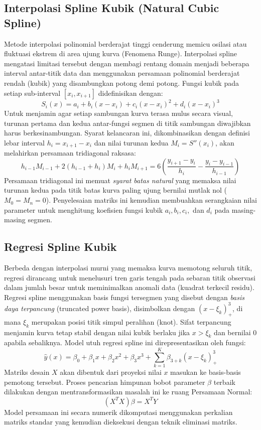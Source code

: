 \documentclass[12pt, a4paper]{article}
\begin{document}
\subsection{Interpolasi Spline Kubik (Natural Cubic Spline)}
Metode interpolasi polinomial berderajat tinggi cenderung memicu osilasi atau fluktuasi ekstrem di area ujung kurva (Fenomena Runge). Interpolasi spline mengatasi limitasi tersebut dengan membagi rentang domain menjadi beberapa interval antar-titik data dan menggunakan persamaan polinomial berderajat rendah (kubik) yang disambungkan potong demi potong. Fungsi kubik pada setiap sub-interval $[x_i, x_{i+1}]$ didefinisikan dengan:
$$S_i(x) = a_i + b_i(x-x_i) + c_i(x-x_i)^2 + d_i(x-x_i)^3$$
Untuk menjamin agar setiap sambungan kurva terasa mulus secara visual, turunan pertama dan kedua antar-fungsi segmen di titik sambungan diwajibkan harus berkesinambungan. Syarat kelancaran ini, dikombinasikan dengan definisi lebar interval $h_i = x_{i+1} - x_i$ dan nilai turunan kedua $M_i = S''(x_i)$, akan melahirkan persamaan tridiagonal raksasa:
$$h_{i-1}M_{i-1} + 2(h_{i-1}+h_i)M_i + h_i M_{i+1} = 6 \left( \frac{y_{i+1}-y_i}{h_i} - \frac{y_i-y_{i-1}}{h_{i-1}} \right)$$
Persamaan tridiagonal ini memuat \textit{syarat batas natural} yang memaksa nilai turunan kedua pada titik batas kurva paling ujung bernilai mutlak nol ($M_0 = M_n = 0$). Penyelesaian matriks ini kemudian membuahkan serangkaian nilai parameter untuk menghitung koefisien fungsi kubik $a_i, b_i, c_i,$ dan $d_i$ pada masing-masing segmen.

\subsection{Regresi Spline Kubik}
Berbeda dengan interpolasi murni yang memaksa kurva memotong seluruh titik, regresi dirancang untuk menelusuri tren garis tengah pada sebaran titik observasi dalam jumlah besar untuk meminimalkan anomali data (kuadrat terkecil residu). Regresi spline menggunakan basis fungsi tersegmen yang disebut dengan \textit{basis daya terpancung} (truncated power basis), disimbolkan dengan $(x - \xi_k)_+^3$, di mana $\xi_k$ merupakan posisi titik simpul peralihan (knot). Sifat terpancung menjamin kurva tetap stabil dengan nilai kubik berlaku jika $x > \xi_k$ dan bernilai $0$ apabila sebaliknya. Model utuh regresi spline ini direpresentasikan oleh fungsi:
$$\hat{y}(x) = \beta_0 + \beta_1x + \beta_2x^2 + \beta_3x^3 + \sum_{k=1}^K \beta_{3+k}(x-\xi_k)_+^3$$
Matriks desain $X$ akan dibentuk dari proyeksi nilai $x$ masukan ke basis-basis pemotong tersebut. Proses pencarian himpunan bobot parameter $\beta$ terbaik dilakukan dengan mentransformasikan masalah ini ke ruang Persamaan Normal:
$$(X^T X)\beta = X^T Y$$
Model persamaan ini secara numerik dikomputasi menggunakan perkalian matriks standar yang kemudian dieksekusi dengan teknik eliminasi matriks.
\end{document}

